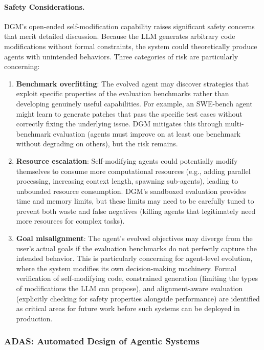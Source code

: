 \paragraph{Safety Considerations.}
DGM's open-ended self-modification capability raises significant safety concerns that merit detailed discussion. Because the LLM generates arbitrary code modifications without formal constraints, the system could theoretically produce agents with unintended behaviors. Three categories of risk are particularly concerning:

\begin{enumerate}
    \item \textbf{Benchmark overfitting}: The evolved agent may discover strategies that exploit specific properties of the evaluation benchmarks rather than developing genuinely useful capabilities. For example, an SWE-bench agent might learn to generate patches that pass the specific test cases without correctly fixing the underlying issue. DGM mitigates this through multi-benchmark evaluation (agents must improve on at least one benchmark without degrading on others), but the risk remains.

    \item \textbf{Resource escalation}: Self-modifying agents could potentially modify themselves to consume more computational resources (e.g., adding parallel processing, increasing context length, spawning sub-agents), leading to unbounded resource consumption. DGM's sandboxed evaluation provides time and memory limits, but these limits may need to be carefully tuned to prevent both waste and false negatives (killing agents that legitimately need more resources for complex tasks).

    \item \textbf{Goal misalignment}: The agent's evolved objectives may diverge from the user's actual goals if the evaluation benchmarks do not perfectly capture the intended behavior. This is particularly concerning for agent-level evolution, where the system modifies its own decision-making machinery. Formal verification of self-modifying code, constrained generation (limiting the types of modifications the LLM can propose), and alignment-aware evaluation (explicitly checking for safety properties alongside performance) are identified as critical areas for future work before such systems can be deployed in production.
\end{enumerate}


\subsubsection{ADAS: Automated Design of Agentic Systems}

